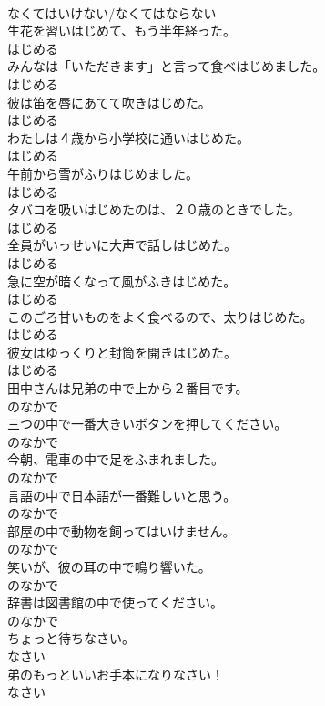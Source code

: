 \documentclass[8pt]{extreport}
\begin{document}
\begin{CJK}{UTF8}{min}
\\	なくてはいけない/なくてはならない	
\\	生花を習いはじめて、もう半年経った。	
\\	はじめる	
\\	みんなは「いただきます」と言って食べはじめました。	
\\	はじめる	
\\	彼は笛を唇にあてて吹きはじめた。	
\\	はじめる	
\\	わたしは４歳から小学校に通いはじめた。	
\\	はじめる	
\\	午前から雪がふりはじめました。	
\\	はじめる	
\\	タバコを吸いはじめたのは、２０歳のときでした。	
\\	はじめる	
\\	全員がいっせいに大声で話しはじめた。	
\\	はじめる	
\\	急に空が暗くなって風がふきはじめた。	
\\	はじめる	
\\	このごろ甘いものをよく食べるので、太りはじめた。	
\\	はじめる	
\\	彼女はゆっくりと封筒を開きはじめた。	
\\	はじめる	
\\	田中さんは兄弟の中で上から２番目です。	
\\	のなかで	
\\	三つの中で一番大きいボタンを押してください。	
\\	のなかで	
\\	今朝、電車の中で足をふまれました。	
\\	のなかで	
\\	言語の中で日本語が一番難しいと思う。	
\\	のなかで	
\\	部屋の中で動物を飼ってはいけません。	
\\	のなかで	
\\	笑いが、彼の耳の中で鳴り響いた。	
\\	のなかで	
\\	辞書は図書館の中で使ってください。	
\\	のなかで	
\\	ちょっと待ちなさい。	
\\	なさい	
\\	弟のもっといいお手本になりなさい！	
\\	なさい	

\end{CJK}
\end{document}

